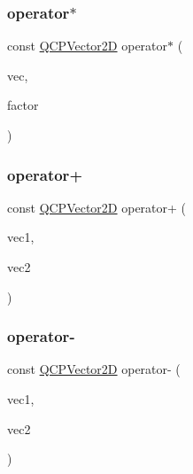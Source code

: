 \mbox{\label{class_q_c_p_vector2_d_aace10d28a76e84e7380ede1a9cb58274}} 
\subsubsection{\texorpdfstring{operator$\ast$}{operator*}\hspace{0.1cm}{\footnotesize\ttfamily [2/2]}}
{\footnotesize\ttfamily const \hyperlink{class_q_c_p_vector2_d}{Q\+C\+P\+Vector2D} operator$\ast$ (\begin{DoxyParamCaption}\item[{const \hyperlink{class_q_c_p_vector2_d}{Q\+C\+P\+Vector2D} \&}]{vec,  }\item[{double}]{factor }\end{DoxyParamCaption})\hspace{0.3cm}{\ttfamily [friend]}}

\mbox{\label{class_q_c_p_vector2_d_a24cc5985429b12dbed4d0d3c5a917d20}} 
\subsubsection{\texorpdfstring{operator+}{operator+}}
{\footnotesize\ttfamily const \hyperlink{class_q_c_p_vector2_d}{Q\+C\+P\+Vector2D} operator+ (\begin{DoxyParamCaption}\item[{const \hyperlink{class_q_c_p_vector2_d}{Q\+C\+P\+Vector2D} \&}]{vec1,  }\item[{const \hyperlink{class_q_c_p_vector2_d}{Q\+C\+P\+Vector2D} \&}]{vec2 }\end{DoxyParamCaption})\hspace{0.3cm}{\ttfamily [friend]}}

\mbox{\label{class_q_c_p_vector2_d_a9e01331d8debf0877ee4cba9abd83605}} 
\subsubsection{\texorpdfstring{operator-\/}{operator-}\hspace{0.1cm}{\footnotesize\ttfamily [1/2]}}
{\footnotesize\ttfamily const \hyperlink{class_q_c_p_vector2_d}{Q\+C\+P\+Vector2D} operator-\/ (\begin{DoxyParamCaption}\item[{const \hyperlink{class_q_c_p_vector2_d}{Q\+C\+P\+Vector2D} \&}]{vec1,  }\item[{const \hyperlink{class_q_c_p_vector2_d}{Q\+C\+P\+Vector2D} \&}]{vec2 }\end{DoxyParamCaption})\hspace{0.3cm}{\ttfamily [friend]}}

